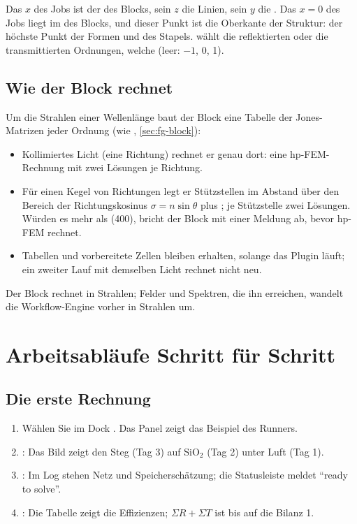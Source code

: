 Das $x$ des Jobs ist der  des Blocks, sein $z$ die Linien, sein $y$ die
. Das $x = 0$ des Jobs liegt im  des Blocks, und dieser Punkt ist die
Oberkante der Struktur: der höchste Punkt der Formen und des Stapels.  wählt die
reflektierten oder die transmittierten Ordnungen,  welche (leer: $-1$, 0, 1).

\subsection{Wie der Block rechnet}

Um die Strahlen einer Wellenlänge baut der Block eine Tabelle der Jones-Matrizen jeder Ordnung
(wie , \autoref{sec:fg-block}):

\begin{itemize}
  \item Kollimiertes Licht (eine Richtung) rechnet er genau dort: eine hp-FEM-Rechnung mit zwei
    Lösungen je Richtung.
  \item Für einen Kegel von Richtungen legt er Stützstellen im Abstand  über den Bereich der Richtungskosinus $\sigma = n \sin\theta$ plus ; je Stützstelle zwei Lösungen. Würden es mehr als  (400),
    bricht der Block mit einer Meldung ab, bevor hp-FEM rechnet.
  \item Tabellen und vorbereitete Zellen bleiben erhalten, solange das Plugin läuft; ein zweiter
    Lauf mit demselben Licht rechnet nicht neu.
\end{itemize}

Der Block rechnet in Strahlen; Felder und Spektren, die ihn erreichen, wandelt die Workflow-Engine
vorher in Strahlen um.

\section{Arbeitsabläufe Schritt für Schritt}\label{sec:hp-ablaeufe}

\subsection{Die erste Rechnung}

\begin{enumerate}
  \item Wählen Sie im Dock  . Das Panel zeigt das Beispiel des Runners.
  \item {}: Das Bild zeigt den Steg (Tag 3) auf SiO$_2$ (Tag 2) unter Luft (Tag 1).
  \item {}: Im Log stehen Netz und Speicherschätzung; die Statusleiste meldet
    \enquote{ready to solve}.
  \item {}: Die Tabelle  zeigt die Effizienzen; $\Sigma R + \Sigma T$ ist
    bis auf die Bilanz 1.
\end{enumerate}

